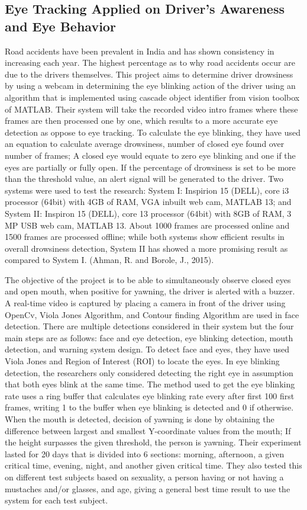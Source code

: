 \subsection{Eye Tracking Applied  on Driver’s Awareness and Eye Behavior}
Road accidents have been prevalent in India and has shown consistency in increasing each year. The highest percentage as to why road accidents occur are due to the drivers themselves. This project aims to determine driver drowsiness by using a webcam in determining the eye blinking action of the driver using an algorithm that is implemented using cascade object identifier from vision toolbox of MATLAB. Their system will take the recorded video intro frames where these frames are then processed one by one, which results to a more accurate eye detection as oppose to eye tracking. To calculate the eye blinking, they have used an equation to calculate average drowsiness, number of closed eye found over number of frames; A closed eye would equate to zero eye blinking and one if the eyes are partially or fully open. If the percentage of drowsiness is set to be more than the threshold value, an alert signal will be generated to the driver. Two systems were used to test the research: System I: Inspirion 15 (DELL), core i3 processor (64bit) with 4GB of RAM, VGA inbuilt web cam, MATLAB 13; and System II: Inspiron 15 (DELL), core 13 processor (64bit) with 8GB of RAM, 3 MP USB web cam, MATLAB 13. About 1000 frames are processed online and 1500 frames are processed offline; while both systems show efficient results in overall drowsiness detection, System II has showed a more promising result as compared to System I. (Ahman, R. and Borole, J., 2015).
\newline

The objective of the project is to be able to simultaneously observe closed eyes and open mouth, when positive for yawning, the driver is alerted with a buzzer. A real-time video is captured by placing a camera in front of the driver using OpenCv, Viola Jones Algorithm, and Contour finding Algorithm are used in face detection. There are multiple detections considered in their system but the four main steps are as follows: face and eye detection, eye blinking detection, mouth detection, and warning system design. To detect face and eyes, they have used Viola Jones and Region of Interest (ROI) to locate the eyes. In eye blinking detection, the researchers only considered detecting the right eye in assumption that both eyes blink at the same time. The method used to get the eye blinking rate uses a ring buffer that calculates eye blinking rate every after first 100 first frames, writing 1 to the buffer when eye blinking is detected and 0 if otherwise. When the mouth is detected, decision of yawning is done by obtaining the difference between largest and smallest Y-coordinate values from the mouth; If the height surpasses the given threshold, the person is yawning. Their experiment lasted for 20 days that is divided into 6 sections: morning, afternoon, a given critical time, evening, night, and another given critical time. They also tested this on different test subjects based on sexuality, a person having or not having a mustaches and/or glasses, and age, giving a general best time result to use the system for each test subject.

